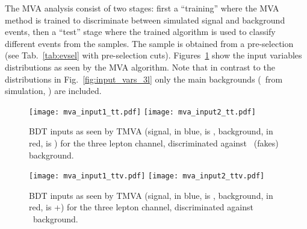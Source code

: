 
The MVA analysis consist of two stages: first a ``training'' where the MVA method is trained to discriminate between simulated signal and background events, then a ``test'' stage where the trained algorithm is used to classify different events from the samples. The sample is obtained from a pre-selection (see Tab.~\ref{tab:evsel} with pre-selection cuts). Figures~\ref{mva_input_tt} show the input variables distributions as seen by the MVA algorithm. Note that in contrast to the distributions in Fig.~\ref{fig:input_vars_3l} only the main backgrounds (\ttbar\ from simulation, \ttV) are included.

\begin{figure} [!h]
  \centering
  \texttt{[image: mva\_input1\_tt.pdf]}
  \texttt{[image: mva\_input2\_tt.pdf]}
\caption[BDT input variables. Discrimination against \ttbar.]{BDT inputs as seen by TMVA (signal, in blue, is \tHq, background, in red, is \ttbar) for the three lepton channel, discriminated against \ttbar\ (fakes) background.} 
\label{mva_input_tt}
\end{figure}

\begin{figure} [!h]
  \centering
  \texttt{[image: mva\_input1\_ttv.pdf]}
  \texttt{[image: mva\_input2\_ttv.pdf]}
\caption[BDT input variables. Discrimination against \ttV\ .]{BDT inputs as seen by TMVA (signal, in blue, is \tHq, background, in red, is \ttW+\ttZ) for the three lepton channel, discriminated against \ttV\ background.}                                                                                                                                                         
\label{mva_input_ttv}
\end{figure}

